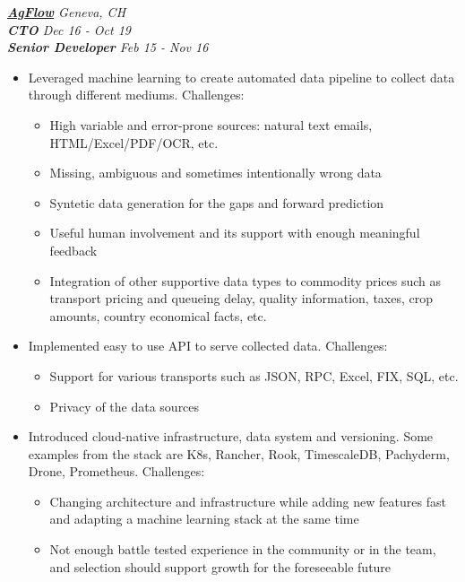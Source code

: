 \documentclass[line, margin]{res}
\begin{document}
\begin{resume}
{\sl \textbf{\href{https://agflow.com}{AgFlow}} \hfill Geneva, CH} \\
{\sl \textbf{CTO} \hfill Dec 16 - Oct 19} \\
{\sl \textbf{Senior Developer} \hfill Feb 15 - Nov 16} \\

\vspace{-0.3cm}
\begin{itemize} \itemsep -5pt
	\item{Leveraged machine learning to create automated data pipeline to collect data through different mediums. Challenges:}
		\begin{itemize} \itemsep -5pt \small
		\vspace{-.2cm}
		\item High variable and error-prone sources: natural text emails, HTML/Excel/PDF/OCR, etc.
		\item Missing, ambiguous and sometimes intentionally wrong data 
		\item Syntetic data generation for the gaps and forward prediction
		\item Useful human involvement and its support with enough meaningful feedback
		\item Integration of other supportive data types to commodity prices such as transport pricing and queueing delay, quality information, taxes, crop amounts, country economical facts, etc.
		\end{itemize}
		
	\item{Implemented easy to use API to serve collected data. Challenges:}
		\begin{itemize} \itemsep -5pt \small
		\vspace{-.2cm}
		\item Support for various transports such as JSON, RPC, Excel, FIX, SQL, etc.
		\item Privacy of the data sources
		\end{itemize}
		
	\item{Introduced cloud-native infrastructure, data system and versioning. Some examples from the stack are K8s, Rancher, Rook, TimescaleDB, Pachyderm, Drone, Prometheus. Challenges:}
		\begin{itemize} \itemsep -5pt \small
		\vspace{-.2cm}
		\item Changing architecture and infrastructure while adding new features fast and adapting a machine learning stack at the same time
		\item Not enough battle tested experience in the community or in the team, and selection should support growth for the foreseeable future
		\end{itemize}			


\end{itemize}
\end{resume}
\end{document}

